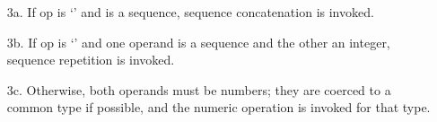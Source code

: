 \begin{itemize}
\begin{itemize}
	\item[3a.] If op is `\code{+}' and  is a sequence,
	sequence concatenation is invoked.

	\item[3b.] If op is `\code{*}' and one operand is a sequence
	and the other an integer, sequence repetition is invoked.

	\item[3c.] Otherwise, both operands must be numbers; they are
	coerced to a common type if possible, and the numeric
	operation is invoked for that type.

	\end{itemize}

\end{itemize}
